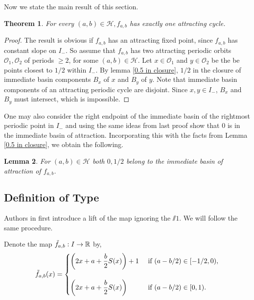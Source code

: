 \documentclass[12pt]{amsart}
\numberwithin{equation}{section}
\newtheorem{theorem}{Theorem}[section]
\newtheorem{lemma}[theorem]{Lemma}
\theoremstyle{remark}
\begin{document}
Now we state the main result of this section.    

\begin{theorem}\label{uniqueness of periodic attractor}
For every $(a,b) \in \mathcal H, f_{a,b}$ has exactly one attracting cycle.  
\end{theorem}
  

\begin{proof}
The result is obvious if $f_{a,b}$ has an attracting fixed point, since $f_{a,b}$ has constant slope on $I_-$. 
So assume that $f_{a,b}$ has two attracting periodic orbits $\mathcal{O}_1,\mathcal{O}_2$ of periods $\geq 2 $, for some  $(a,b) \in \mathcal H$. Let $x \in \mathcal{O}_1$ and $y \in \mathcal{O}_2$ be the be points closest to $1/2$ within $I_-$. By lemma \ref{0.5 in closure}, $1/2$ in the closure of immediate basin components $B_x$ of $x$ and $B_y$ of $y$. Note that immediate basin components of an attracting periodic cycle  are disjoint. Since $x,y \in I_-$, $B_x$ and $B_y$ must intersect, which is impossible. 
\end{proof}   

       
       

  
One may also consider the right endpoint of the immediate basin of the rightmost periodic point in $I_-$ and using the same ideas from last proof show that $0$ is in the immediate basin of attraction. Incorporating this with the facts from Lemma \ref{0.5 in closure},  we obtain the following. 
\begin{lemma}\label{0,1 in basin}
    For $(a,b)\in \mathcal{H}$ both $0,1/2$ belong to the immediate basin of attraction of $f_{a,b}$.

    
\end{lemma}



\subsection{\textbf{Definition of Type}}
 Authors in \cite{MR} first introduce a lift of the map ignoring the $ \sslash1 $. We will follow the same procedure.
 
 Denote the map $\Tilde{f}_{a,b}: I \to \mathbb{R}$ by,
\[
\Tilde{f}_{a,b}(x)=\begin{cases}
              \left(2x+a+\dfrac{b}{2} S(x) \right)+1 &\text{  if $(a-b/2) \in [-1/2,0)$},\\\\
              \left(2x+a+\dfrac{b}{2} S(x) \right)&\text{  if $(a -b/2) \in [0,1)$}.\end{cases}
              \]
\end{document}
